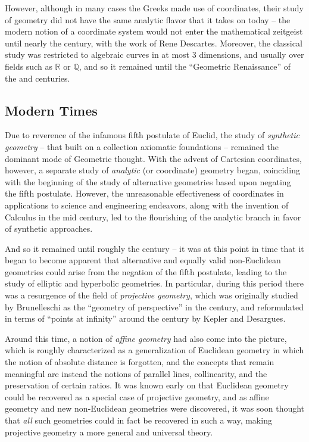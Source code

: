 \documentclass{article}
\theoremstyle{definition}
\newcommand{\RR}{\mathbb{R}}
\newcommand\QQ{\mathbb{Q}}
\begin{document}
However, although in many cases the Greeks made use of coordinates,
their study of geometry did not have the same analytic flavor that it
takes on today -- the modern notion of a coordinate system would not
enter the mathematical zeitgeist until nearly the  century, with the
work of Rene Descartes. Moreover, the classical study was restricted to
algebraic curves in at most 3 dimensions, and usually over fields such
as $\RR$ or $\QQ$, and so it remained until the ``Geometric
Renaissance'' of the  and  centuries.

\subsection{Modern Times}\label{header-n42}

Due to reverence of the infamous fifth postulate of Euclid, the study of
\emph{synthetic geometry} -- that built on a collection axiomatic
foundations -- remained the dominant mode of Geometric thought. With the
advent of Cartesian coordinates, however, a separate study of
\emph{analytic} (or coordinate) geometry began, coinciding with the
beginning of the study of alternative geometries based upon negating the
fifth postulate. However, the unreasonable effectiveness of coordinates
in applications to science and engineering endeavors, along with the
invention of Calculus in the mid  century, led to the flourishing of
the analytic branch in favor of synthetic approaches.

And so it remained until roughly the  century -- it was at this point
in time that it began to become apparent that alternative and equally
valid non-Euclidean geometries could arise from the negation of the
fifth postulate, leading to the study of elliptic and hyperbolic
geometries. In particular, during this period there was a resurgence of
the field of \emph{projective geometry}, which was originally studied by
Brunelleschi as the ``geometry of perspective'' in the  century, and
reformulated in terms of ``points at infinity'' around the  century by
Kepler and Desargues.

Around this time, a notion of \emph{affine geometry} had also come into
the picture, which is roughly characterized as a generalization of
Euclidean geometry in which the notion of absolute distance is
forgotten, and the concepts that remain meaningful are instead the
notions of parallel lines, collinearity, and the preservation of certain
ratios. It was known early on that Euclidean geometry could be recovered
as a special case of projective geometry, and as affine geometry and new
non-Euclidean geometries were discovered, it was soon thought that
\emph{all} such geometries could in fact be recovered in such a way,
making projective geometry a more general and universal theory.
\end{document}
